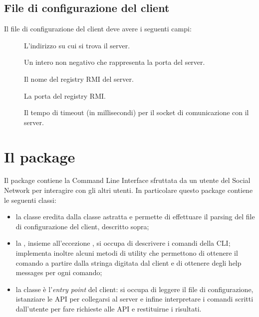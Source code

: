 \documentclass[
    oneside,
    10pt,
    language=italian,
    a4paper,
    article
]{notes}
\begin{document}
\subsection{File di configurazione del client}
Il file di configurazione del client deve avere i seguenti campi:
\begin{description}
    \item[] L'indirizzo su cui si trova il server.
    \item[] Un intero non negativo che rappresenta la porta del server.
    \item[] Il nome del registry RMI del server.
    \item[] La porta del registry RMI.
    \item[] Il tempo di timeout (in millisecondi) per il socket
        di comunicazione con il server.      
\end{description}

\section{Il package } \label{sec:client}
Il package  contiene la Command Line Interface sfruttata
da un utente del Social Network per interagire con gli altri utenti. 
In particolare questo package contiene le seguenti classi:
\begin{itemize}
    \item la classe  eredita dalla classe astratta 
         e permette di effettuare
        il parsing del file di configurazione del client, descritto sopra;
    \item la  , insieme all'eccezione 
        , si occupa di descrivere i
        comandi della CLI; implementa inoltre alcuni metodi di utility che
        permettono di ottenere il comando a partire dalla stringa digitata dal
        client e di ottenere degli help messages per ogni comando;
    \item la classe  è l'\emph{entry point} del client:
        si occupa di leggere il file di configurazione, istanziare le API per
        collegarsi al server e infine interpretare i comandi scritti dall'utente
        per fare richieste alle API e restituirne i risultati.
\end{itemize}
\end{document}
